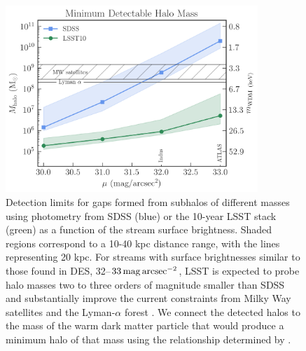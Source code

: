 \begin{figure}
\centering
\includegraphics[width=0.85\textwidth]{figures/streamgap_constraint_2.png}
\caption{\label{fig:streamsurveys} Detection limits for gaps formed from subhalos of different masses using photometry from SDSS (blue) or the 10-year LSST stack (green) as a function of the stream surface brightness.
Shaded regions correspond to a 10-40 kpc distance range, with the lines representing 20 kpc. For streams with surface brightnesses similar to those found in DES, 32--$33 \mathrm{\,mag} \mathrm{\,arcsec}^{-2}$, LSST is expected to probe halo masses two to three orders of magnitude smaller than SDSS and substantially improve the current constraints from Milky Way satellites \citep{Nadler:2018, Jethwa:2018,Kim:2017iwr} and the Lyman-$\alpha$ forest \citep{2017PhRvD..96b3522I}. 
We connect the detected halos to the mass of the warm dark matter particle that would produce a minimum halo of that mass using the relationship determined by \cite{Bullock:2017xww}. 
}
\end{figure}


